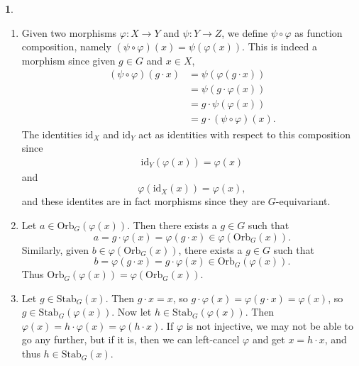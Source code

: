\documentclass[12pt]{article}
\theoremstyle{definition}
\newtheorem{ex}{}
\newenvironment{exercise}[1]{
	\renewcommand{\theex}{#1}
	\begin{ex}
		}{\end{ex}}
\begin{document}
\begin{exercise}{10}\
	\begin{enumerate}[label=(\alph*)]
		\item Given two morphisms $\varphi : X \to Y$ and $\psi : Y \to Z$, we define $\psi \circ \varphi$ as function composition, namely $(\psi \circ \varphi)(x) = \psi(\varphi(x))$.
		      This is indeed a morphism since given $g \in G$ and $x \in X$, \begin{align*}
			      (\psi \circ \varphi) (g \cdot x) & = \psi(\varphi(g \cdot x))         \\
			                                       & = \psi(g \cdot \varphi(x))         \\
			                                       & = g \cdot \psi(\varphi(x))         \\
			                                       & = g \cdot (\psi \circ \varphi)(x).
		      \end{align*}
		      The identities $\mathrm{id}_X$ and $\mathrm{id}_Y$ act as identities with respect to this composition since \begin{align*}
			      \mathrm{id}_Y (\varphi(x)) = \varphi(x)
		      \end{align*}
		      and \begin{equation*}
			      \varphi(\mathrm{id}_X(x)) = \varphi(x),
		      \end{equation*}
		      and these identites are in fact morphisms since they are $G$-equivariant.
		\item Let $a \in \mathrm{Orb}_G(\varphi(x))$.
		      Then there exists a $g \in G$ such that \begin{equation*}
			      a = g \cdot \varphi(x) = \varphi(g \cdot x) \in \varphi(\mathrm{Orb}_G(x)).
		      \end{equation*}
		      Similarly, given $b \in \varphi(\mathrm{Orb}_G(x))$, there exists a $g \in G$ such that \begin{equation*}
			      b = \varphi(g \cdot x) = g \cdot \varphi(x) \in \mathrm{Orb}_G(\varphi(x)).
		      \end{equation*}
          Thus $\mathrm{Orb}_G(\varphi(x)) = \varphi(\mathrm{Orb}_G(x))$.
        \item Let $g \in \mathrm{Stab}_G(x)$.
          Then $g \cdot x = x$, so $g \cdot \varphi(x) = \varphi(g \cdot x) = \varphi(x)$, so $g \in \mathrm{Stab}_G(\varphi(x))$.
          Now let $h \in \mathrm{Stab}_G(\varphi(x))$.
          Then $\varphi(x) = h \cdot \varphi (x) = \varphi(h \cdot x)$.
          If $\varphi$ is not injective, we may not be able to go any further, but if it is, then we can left-cancel $\varphi$ and get $x = h \cdot x$, and thus $h \in \mathrm{Stab}_G(x)$.
	\end{enumerate}
\end{exercise}
\end{document}
